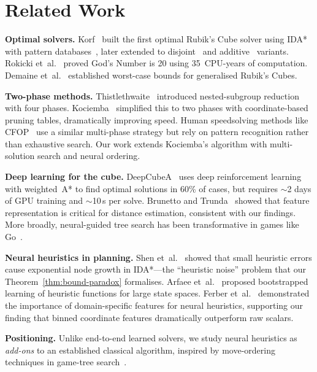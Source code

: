 \documentclass[graybox]{svmult}
\begin{document}
\section{Related Work}
\label{sec:related}

\textbf{Optimal solvers.}
Korf~\cite{korf1997} built the first optimal Rubik's Cube solver using IDA*~\cite{korf1985} with pattern databases~\cite{culberson1998}, later extended to disjoint~\cite{korf2002} and additive~\cite{felner2004} variants. Rokicki et~al.~\cite{godnumber} proved God's Number is 20 using 35~CPU-years of computation. Demaine et~al.~\cite{demaine2018} established worst-case bounds for generalised Rubik's Cubes.

\textbf{Two-phase methods.}
Thistlethwaite~\cite{thistlethwaite1981} introduced nested-subgroup reduction with four phases. Kociemba~\cite{kociemba} simplified this to two phases with coordinate-based pruning tables, dramatically improving speed. Human speedsolving methods like CFOP~\cite{fridrich} use a similar multi-phase strategy but rely on pattern recognition rather than exhaustive search. Our work extends Kociemba's algorithm with multi-solution search and neural ordering.

\textbf{Deep learning for the cube.}
DeepCubeA~\cite{deepcubea} uses deep reinforcement learning with weighted~A* to find optimal solutions in 60\% of cases, but requires $\sim$2 days of GPU training and $\sim$10\,s per solve. Brunetto and Trunda~\cite{brunetto2017} showed that feature representation is critical for distance estimation, consistent with our findings. More broadly, neural-guided tree search has been transformative in games like Go~\cite{silver2016, silver2017}.

\textbf{Neural heuristics in planning.}
Shen et~al.~\cite{shen2020} showed that small heuristic errors cause exponential node growth in IDA*---the ``heuristic noise'' problem that our Theorem~\ref{thm:bound-paradox} formalises. Arfaee et~al.~\cite{arfaee2011} proposed bootstrapped learning of heuristic functions for large state spaces. Ferber et~al.~\cite{ferber2022} demonstrated the importance of domain-specific features for neural heuristics, supporting our finding that binned coordinate features dramatically outperform raw scalars.

\textbf{Positioning.}
Unlike end-to-end learned solvers, we study neural heuristics as \emph{add-ons} to an established classical algorithm, inspired by move-ordering techniques in game-tree search~\cite{schaeffer1989, reinefeld1994}.
\end{document}
